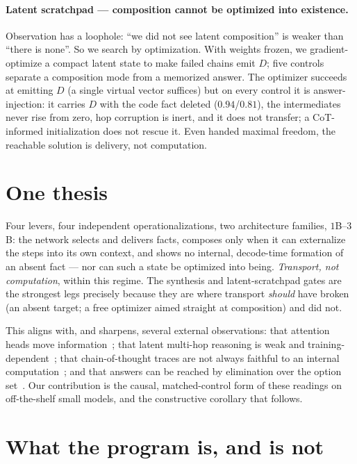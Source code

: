 \documentclass[11pt]{article}
\begin{document}
\paragraph{Latent scratchpad --- composition cannot be optimized into existence.}
Observation has a loophole: ``we did not see latent composition'' is weaker than ``there
is none''. So we search by optimization. With weights frozen, we gradient-optimize a
compact latent state to make failed chains emit $D$; five controls separate a
composition mode from a memorized answer. The optimizer succeeds at emitting $D$
(a single virtual vector suffices) but on every control it is answer-injection: it
carries $D$ with the code fact deleted ($0.94$/$0.81$), the intermediates never rise
from zero, hop corruption is inert, and it does not transfer; a CoT-informed
initialization does not rescue it. Even handed maximal freedom, the reachable solution
is delivery, not computation.

\section{One thesis}
\label{sec:thesis}

Four levers, four independent operationalizations, two architecture families, $1$B--$3$B:
the network selects and delivers facts, composes only when it can externalize the steps
into its own context, and shows no internal, decode-time formation of an absent fact ---
nor can such a state be optimized into being. \emph{Transport, not computation}, within
this regime. The synthesis and latent-scratchpad gates are the strongest legs precisely
because they are where transport \emph{should} have broken (an absent target; a free
optimizer aimed straight at composition) and did not.

This aligns with, and sharpens, several external observations: that attention heads move
information~\cite{elhage2021mathematical}; that latent multi-hop reasoning is weak and
training-dependent~\cite{yang2024latent,wang2024grokking}; that chain-of-thought traces
are not always faithful to an internal computation~\cite{lanham2023faithfulness}; and
that answers can be reached by elimination over the option
set~\cite{balepur2024elimination}. Our contribution is the causal, matched-control form
of these readings on off-the-shelf small models, and the constructive corollary that
follows.

\section{What the program is, and is not}
\label{sec:map}
\end{document}
